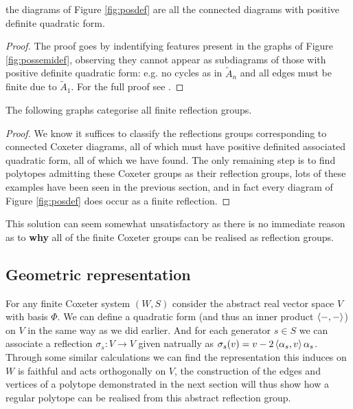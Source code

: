 \documentclass[../main.tex]{subfiles}
\begin{document}
\begin{theorem}
    the diagrams of Figure \ref{fig:posdef} are all the connected diagrams with positive definite quadratic form.
    \begin{proof}
        The proof goes by indentifying features present in the graphs of Figure \ref{fig:possemidef}, observing they cannot appear as subdiagrams of those with positive definite quadratic form: e.g. no cycles as in $\tilde{A}_n$ and all edges must be finite due to $\tilde{A}_1$. For the full proof see \cite{Humphreys1990}.
    \end{proof}
\end{theorem}

\begin{corollary}
    The following graphs categorise all finite reflection groups.
    \begin{proof}
        We know it suffices to classify the reflections groups corresponding to connected Coxeter diagrams, all of which must have positive definited associated quadratic form, all of which we have found. The only remaining step is to find polytopes admitting these Coxeter groups as their reflection groups, lots of these examples have been seen in the previous section, and in fact every diagram of Figure \ref{fig:posdef} does occur as a finite reflection.
    \end{proof}
\end{corollary}

This solution can seem somewhat unsatisfactory as there is no immediate reason as to \textbf{why} all of the finite Coxeter groups can be realised as reflection groups.

\subsection{Geometric representation}\label{geom:rep}

For any finite Coxeter system $(W,S)$ consider the abstract real vector space $V$ with basis $\Phi$. We can define a quadratic form (and thus an inner product  $\left\langle -,- \right\rangle$) on $V$ in the same way as we did earlier. And for each generator $s\in S$ we can associate a reflection $\sigma_s:V\rightarrow V$ given natrually as $\sigma_s (v) = v-2\left\langle \alpha_s,v \right\rangle\alpha_s$. Through some similar calculations we can find the representation this induces on $W$ is faithful and acts orthogonally on $V$, the construction of the edges and vertices of a polytope demonstrated in the next section will thus show how a regular polytope can be realised from this abstract reflection group.
\end{document}
